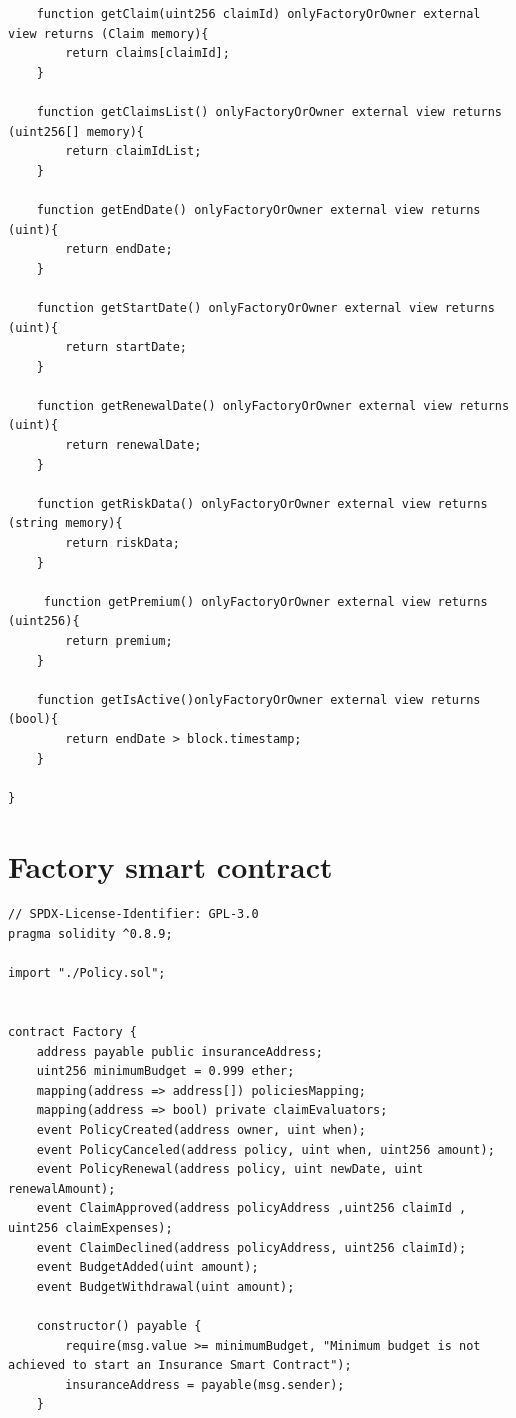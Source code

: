 \documentclass[a4paper,12pt]{article}
\begin{document}
\begin{appendices}
\begin{lstlisting}
    function getClaim(uint256 claimId) onlyFactoryOrOwner external view returns (Claim memory){
        return claims[claimId];
    }

    function getClaimsList() onlyFactoryOrOwner external view returns (uint256[] memory){
        return claimIdList;
    }

    function getEndDate() onlyFactoryOrOwner external view returns (uint){
        return endDate;
    }

    function getStartDate() onlyFactoryOrOwner external view returns (uint){
        return startDate;
    }

    function getRenewalDate() onlyFactoryOrOwner external view returns (uint){
        return renewalDate;
    }

    function getRiskData() onlyFactoryOrOwner external view returns (string memory){
        return riskData;
    }

     function getPremium() onlyFactoryOrOwner external view returns (uint256){
        return premium;
    }

    function getIsActive()onlyFactoryOrOwner external view returns (bool){
        return endDate > block.timestamp;
    }

}
\end{lstlisting}

\section{Factory smart contract}
\label{appendix:factory-sc}
\begin{lstlisting}
// SPDX-License-Identifier: GPL-3.0
pragma solidity ^0.8.9;

import "./Policy.sol";


contract Factory {
    address payable public insuranceAddress;
    uint256 minimumBudget = 0.999 ether;
    mapping(address => address[]) policiesMapping;
    mapping(address => bool) private claimEvaluators;
    event PolicyCreated(address owner, uint when);
    event PolicyCanceled(address policy, uint when, uint256 amount);
    event PolicyRenewal(address policy, uint newDate, uint renewalAmount);
    event ClaimApproved(address policyAddress ,uint256 claimId , uint256 claimExpenses);
    event ClaimDeclined(address policyAddress, uint256 claimId);
    event BudgetAdded(uint amount);
    event BudgetWithdrawal(uint amount);

    constructor() payable {
        require(msg.value >= minimumBudget, "Minimum budget is not achieved to start an Insurance Smart Contract");
        insuranceAddress = payable(msg.sender);
    }



\end{lstlisting}
\end{appendices}
\end{document}
